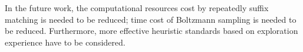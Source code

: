\documentclass[conference]{IEEEtran}
\begin{document}
	In the future work, the computational resources cost by repeatedly suffix matching
	is needed to be reduced; time cost of Boltzmann sampling is needed to be reduced.
	Furthermore, more effective heuristic standards based on exploration experience have
	to be considered. 
	
	
	
	
%	
%	

	
	
\end{document}

